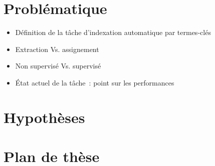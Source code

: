 
  \section{Problématique}
  \label{sec:main-introduction-problem_statement}
    \begin{itemize}
      \item{Définition de la tâche d'indexation automatique par termes-clés}
      \item{Extraction Vs. assignement}
      \item{Non supervisé Vs. supervisé}
      \item{État actuel de la tâche~: point sur les performances}
    \end{itemize}


  \section{Hypothèses}
  \label{sec:main-introduction-hypothesis}


  \section{Plan de thèse}
  \label{sec:main-introduction-outline}


